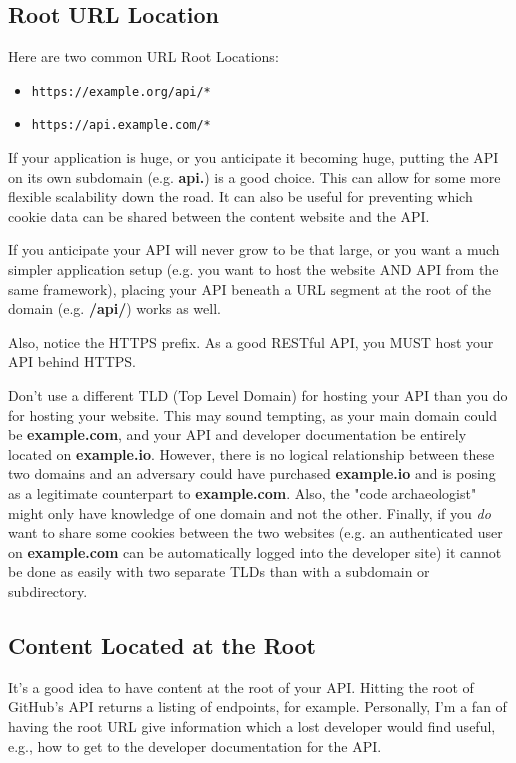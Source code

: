 \documentclass{book}
\begin{document}
\subsection{Root URL Location}

Here are two common URL Root Locations:

\begin{itemize}
\item \texttt{https://example.org/api/*}
\item \texttt{https://api.example.com/*}
\end{itemize}

If your application is huge, or you anticipate it becoming huge, putting the API on its own subdomain (e.g. \textbf{api.}) is a good choice. This can allow for some more flexible scalability down the road. It can also be useful for preventing which cookie data can be shared between the content website and the API.

If you anticipate your API will never grow to be that large, or you want a much simpler application setup (e.g. you want to host the website AND API from the same framework), placing your API beneath a URL segment at the root of the domain (e.g. \textbf{/api/}) works as well.

Also, notice the HTTPS prefix. As a good RESTful API, you MUST host your API behind HTTPS.

Don't use a different TLD (Top Level Domain) for hosting your API than you do for hosting your website. This may sound tempting, as your main domain could be \textbf{example.com}, and your API and developer documentation be entirely located on \textbf{example.io}. However, there is no logical relationship between these two domains and an adversary could have purchased \textbf{example.io} and is posing as a legitimate counterpart to \textbf{example.com}. Also, the "code archaeologist" might only have knowledge of one domain and not the other. Finally, if you \emph{do} want to share some cookies between the two websites (e.g. an authenticated user on \textbf{example.com} can be automatically logged into the developer site) it cannot be done as easily with two separate TLDs than with a subdomain or subdirectory.

\subsection{Content Located at the Root}

It's a good idea to have content at the root of your API. Hitting the root of GitHub's API returns a listing of endpoints, for example. Personally, I'm a fan of having the root URL give information which a lost developer would find useful, e.g., how to get to the developer documentation for the API.
\end{document}
